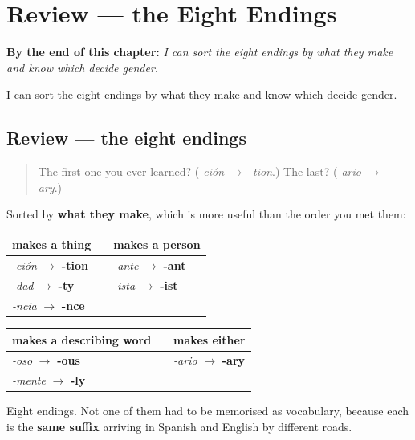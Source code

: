 
\chapter{Review --- the Eight Endings}
\label{ch:repaso-ocho}

\begin{chapteropening}
\textbf{By the end of this chapter:} \emph{I can sort the eight endings by what they make and know which decide gender.}

I can sort the eight endings by what they make and know which decide gender.
\end{chapteropening}

\section[the eight endings]{Review — the eight endings}

\label{lesson:ES-C09-repaso-ocho}



\begin{quote}
The first one you ever learned? (\emph{-ción} $\to$ \emph{-tion}.) The last? (\emph{-ario} $\to$ \emph{-ary}.)
\end{quote}

\begin{grammarlens}[title={What you've built}]
Sorted by \textbf{what they make}, which is more useful than the order you met them:

\noindent
\begin{tabularx}{\linewidth}{@{}>{\raggedright\arraybackslash}X>{\raggedright\arraybackslash}X>{\raggedright\arraybackslash}X@{}}
\toprule
\textbf{makes a thing} & \textbf{} & \textbf{makes a person} \\
\midrule
\emph{-ción} $\to$ \textbf{-tion} &  & \emph{-ante} $\to$ \textbf{-ant} \\
\emph{-dad} $\to$ \textbf{-ty} &  & \emph{-ista} $\to$ \textbf{-ist} \\
\emph{-ncia} $\to$ \textbf{-nce} &  &  \\
\bottomrule
\end{tabularx}

\noindent
\begin{tabularx}{\linewidth}{@{}>{\raggedright\arraybackslash}X>{\raggedright\arraybackslash}X>{\raggedright\arraybackslash}X@{}}
\toprule
\textbf{makes a describing word} & \textbf{} & \textbf{makes either} \\
\midrule
\emph{-oso} $\to$ \textbf{-ous} &  & \emph{-ario} $\to$ \textbf{-ary} \\
\emph{-mente} $\to$ \textbf{-ly} &  &  \\
\bottomrule
\end{tabularx}

Eight endings. Not one of them had to be memorised as vocabulary, because each is the \textbf{same suffix} arriving in Spanish and English by different roads.
\end{grammarlens}

